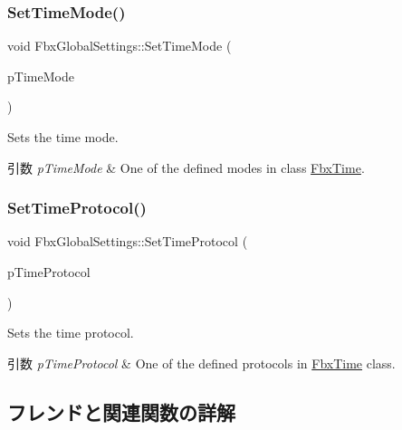 \subsubsection{\texorpdfstring{Set\+Time\+Mode()}{SetTimeMode()}}
{\footnotesize\ttfamily void Fbx\+Global\+Settings\+::\+Set\+Time\+Mode (\begin{DoxyParamCaption}\item[{\hyperlink{class_fbx_time_acc529b00a0e8d4c3da3702449ca93031}{Fbx\+Time\+::\+E\+Mode}}]{p\+Time\+Mode }\end{DoxyParamCaption})}

Sets the time mode. 
\begin{DoxyParams}{引数}
{\em p\+Time\+Mode} & One of the defined modes in class \hyperlink{class_fbx_time}{Fbx\+Time}. \\
\hline
\end{DoxyParams}
\mbox{\label{class_fbx_global_settings_ac3116e61ac13970a735d641b40b44382}} 
\subsubsection{\texorpdfstring{Set\+Time\+Protocol()}{SetTimeProtocol()}}
{\footnotesize\ttfamily void Fbx\+Global\+Settings\+::\+Set\+Time\+Protocol (\begin{DoxyParamCaption}\item[{\hyperlink{class_fbx_time_a10ffa1fdce0aa7f63ec24bdd23afff4b}{Fbx\+Time\+::\+E\+Protocol}}]{p\+Time\+Protocol }\end{DoxyParamCaption})}

Sets the time protocol. 
\begin{DoxyParams}{引数}
{\em p\+Time\+Protocol} & One of the defined protocols in \hyperlink{class_fbx_time}{Fbx\+Time} class. \\
\hline
\end{DoxyParams}


\subsection{フレンドと関連関数の詳解}
\mbox{\label{class_fbx_global_settings_aac0b71d5f5893e5b1c45f6eba4e78b24}} 
